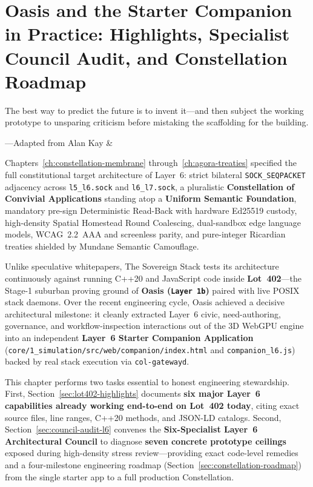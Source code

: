 \chapter{Oasis and the Starter Companion in Practice: Highlights, Specialist Council Audit, and Constellation Roadmap}
\label{ch:oasis-council-l6}

\epigraph{The best way to predict the future is to invent it---and then subject the working prototype to unsparing criticism before mistaking the scaffolding for the building.}{---Adapted from Alan Kay \& \textcite{engelbart1962augmenting}}

Chapters~\ref{ch:constellation-membrane} through~\ref{ch:agora-treaties} specified the full constitutional target architecture of Layer~6: strict bilateral \texttt{SOCK\_SEQPACKET} adjacency across \texttt{l5\_l6.sock} and \texttt{l6\_l7.sock}, a pluralistic \textbf{Constellation of Convivial Applications} standing atop a \textbf{Uniform Semantic Foundation}, mandatory pre-sign Deterministic Read-Back with hardware Ed25519 custody, high-density Spatial Homestead Round Coalescing, dual-sandbox edge language models, WCAG~2.2~AAA and screenless parity, and pure-integer Ricardian treaties shielded by Mundane Semantic Camouflage.

Unlike speculative whitepapers, The Sovereign Stack tests its architecture continuously against running C++20 and JavaScript code inside \textbf{Lot~402}---the Stage-1 suburban proving ground of \textbf{Oasis (\texttt{Layer 1b})} paired with live POSIX stack daemons. Over the recent engineering cycle, Oasis achieved a decisive architectural milestone: it cleanly extracted Layer~6 civic, need-authoring, governance, and workflow-inspection interactions out of the 3D WebGPU engine into an independent \textbf{Layer~6 Starter Companion Application} (\texttt{core/1\_simulation/src/web/companion/index.html} and \texttt{companion\_l6.js}) backed by real stack execution via \texttt{col-gatewayd}.

This chapter performs two tasks essential to honest engineering stewardship. First, Section~\ref{sec:lot402-highlights} documents \textbf{six major Layer~6 capabilities already working end-to-end on Lot~402 today}, citing exact source files, line ranges, C++20 methods, and JSON-LD catalogs. Second, Section~\ref{sec:council-audit-l6} convenes the \textbf{Six-Specialist Layer~6 Architectural Council} to diagnose \textbf{seven concrete prototype ceilings} exposed during high-density stress review---providing exact code-level remedies and a four-milestone engineering roadmap (Section~\ref{sec:constellation-roadmap}) from the single starter app to a full production Constellation.

